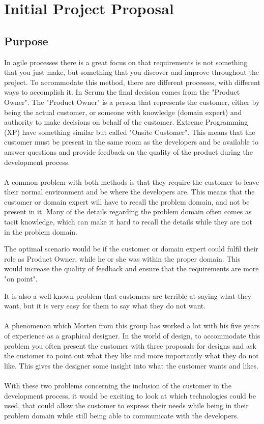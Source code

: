 \section{Initial Project Proposal}
\subsection{Purpose}
In agile processes there is a great focus on that requirements is not something that you just make, but something that you discover and improve throughout the project.
To accommodate this method, there are different processes, with different ways to accomplish it. 
In Scrum the final decision comes from the "Product Owner".
The "Product Owner" is a person that represents the customer, either by being the actual customer, or someone with knowledge (domain expert) and authority to make decisions on behalf of the customer. 
Extreme Programming (XP) have something similar but called "Onsite Customer".
This means that the customer must be present in the same room as the developers and be available to answer questions and provide feedback on the quality of the product during the development process. 
\\\\
A common problem with both methods is that they require the customer to leave their normal environment and be where the developers are. 
This means that the customer or domain expert will have to recall the problem domain, and not be present in it.
Many of the details regarding the problem domain often comes as tacit knowledge, which can make it hard to recall the details while they are not in the problem domain. 

The optimal scenario would be if the customer or domain expert could fulfil their role as Product Owner, while he or she was within the proper domain. 
This would increase the quality of feedback and ensure that the requirements are more "on point".

It is also a well-known problem that customers are terrible at saying what they want, but it is very easy for them to say what they do not want.
\\\\
A phenomenon which Morten from this group has worked a lot with his five years of experience as a graphical designer.
In the world of design, to accommodate this problem you often present the customer with three proposals for designs and ask the customer to point out what they like and more importantly what they do not like.
This gives the designer some insight into what the customer wants and likes. 
\\\\
With these two problems concerning the inclusion of the customer in the development process, it would be exciting to look at which technologies could be used, that could allow the customer to express their needs while being in their problem domain while still being able to communicate with the developers. 

